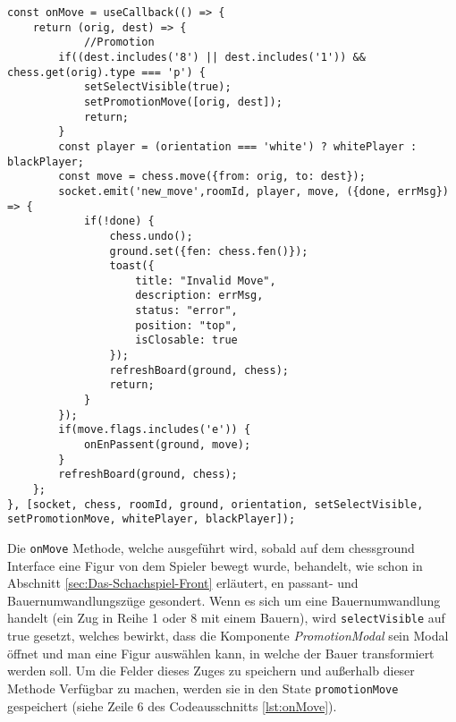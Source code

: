 \begin{lstlisting}[style=codeStyle, caption={Die onMove Methode}, label={lst:onMove}]
const onMove = useCallback(() => {
    return (orig, dest) => {
    		//Promotion
        if((dest.includes('8') || dest.includes('1')) && chess.get(orig).type === 'p') { 
            setSelectVisible(true);
            setPromotionMove([orig, dest]);
            return;
        }
        const player = (orientation === 'white') ? whitePlayer : blackPlayer;
        const move = chess.move({from: orig, to: dest});
        socket.emit('new_move',roomId, player, move, ({done, errMsg}) => {
            if(!done) {
                chess.undo();
                ground.set({fen: chess.fen()});
                toast({
                    title: "Invalid Move",
                    description: errMsg,
                    status: "error",
                    position: "top",
                    isClosable: true
                });
                refreshBoard(ground, chess);
                return;
            }
        });
        if(move.flags.includes('e')) {
            onEnPassent(ground, move);
        }
        refreshBoard(ground, chess);
    };
}, [socket, chess, roomId, ground, orientation, setSelectVisible, setPromotionMove, whitePlayer, blackPlayer]);
\end{lstlisting}

Die \verb|onMove| Methode, welche ausgeführt wird, sobald auf dem chessground Interface eine Figur von dem Spieler bewegt wurde, behandelt, wie schon in Abschnitt \ref{sec:Das-Schachspiel-Front} erläutert, en passant- und Bauernumwandlungszüge gesondert. Wenn es sich um eine Bauernumwandlung handelt (ein Zug in Reihe 1 oder 8 mit einem Bauern), wird \verb|selectVisible| auf true gesetzt, welches bewirkt, dass die Komponente \textit{PromotionModal} sein Modal öffnet und man eine Figur auswählen kann, in welche der Bauer transformiert werden soll. Um die Felder dieses Zuges zu speichern und außerhalb dieser Methode Verfügbar zu machen, werden sie in den State \verb|promotionMove| gespeichert (siehe Zeile 6 des Codeausschnitts \ref{lst:onMove}).

